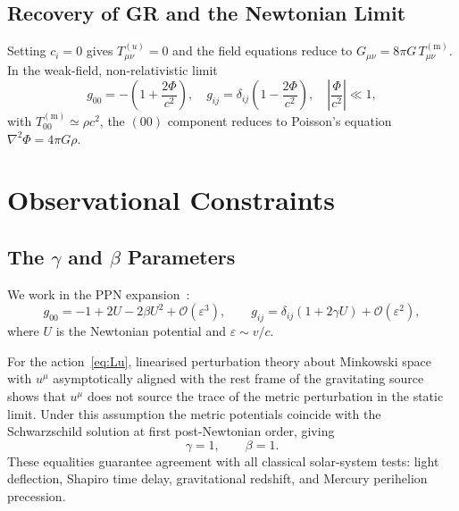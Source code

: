 \documentclass[12pt,a4paper]{article}
\newcommand{\Tmm}{T^{(\mathrm{m})}_{\mu\nu}}
\newcommand{\Tuu}{T^{(u)}_{\mu\nu}}
\begin{document}
\subsection{Recovery of GR and the Newtonian Limit}

Setting $c_{i}=0$ gives $\Tuu=0$ and the field equations reduce to
$G_{\mu\nu}=8\pi G\,\Tmm$. In the weak-field, non-relativistic limit
\begin{equation}
  g_{00}=-\!\left(1+\frac{2\Phi}{c^{2}}\right),\quad
  g_{ij}=\delta_{ij}\!\left(1-\frac{2\Phi}{c^{2}}\right),\quad
  \left|\frac{\Phi}{c^{2}}\right|\ll 1,
\end{equation}
with $T^{(\mathrm{m})}_{00}\simeq\rho c^{2}$, the $(00)$ component reduces to
Poisson's equation $\nabla^{2}\Phi=4\pi G\rho$.

\section{Observational Constraints}
\label{sec:obs}

\subsection{The \texorpdfstring{$\gamma$}{gamma} and
            \texorpdfstring{$\beta$}{beta} Parameters}


We work in the PPN expansion~\citep{will1993,will2014}:
\begin{equation}
  g_{00}=-1+2U-2\beta U^{2}+\mathcal{O}(\varepsilon^{3}),\qquad
  g_{ij}=\delta_{ij}(1+2\gamma U)+\mathcal{O}(\varepsilon^{2}),
\end{equation}
where $U$ is the Newtonian potential and $\varepsilon\sim v/c$.

For the action~\eqref{eq:Lu}, linearised perturbation theory about Minkowski
space with $u^{\mu}$ asymptotically aligned with the rest frame of the
gravitating source shows that $u^{\mu}$ does not source the trace of the
metric perturbation in the static limit. Under this assumption the metric
potentials coincide with the Schwarzschild solution at first post-Newtonian
order, giving~\citep{foster2006}
\begin{equation}
  \gamma=1,\qquad\beta=1.
  \label{eq:gammabeta}
\end{equation}
These equalities guarantee agreement with all classical solar-system tests:
light deflection, Shapiro time delay, gravitational redshift, and Mercury
perihelion precession.
\end{document}

